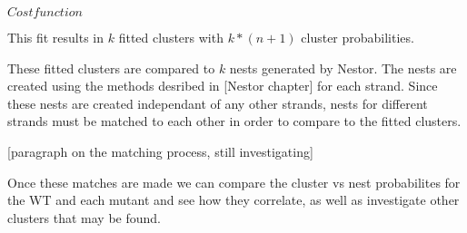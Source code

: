 $ Cost function $

This fit results in $k$ fitted clusters with $k*(n+1)$ cluster
probabilities.

These fitted clusters are compared to $k$ nests generated by
Nestor. The nests are created using the methods desribed in [Nestor
chapter] for each strand. Since these nests are created independant of
any other strands, nests for different strands must be matched to each
other in order to compare to the fitted clusters.

[paragraph on the matching process, still investigating]

Once these matches are made we can compare the cluster vs nest
probabilites for the WT and each mutant and see how they correlate, as
well as investigate other clusters that may be found.
